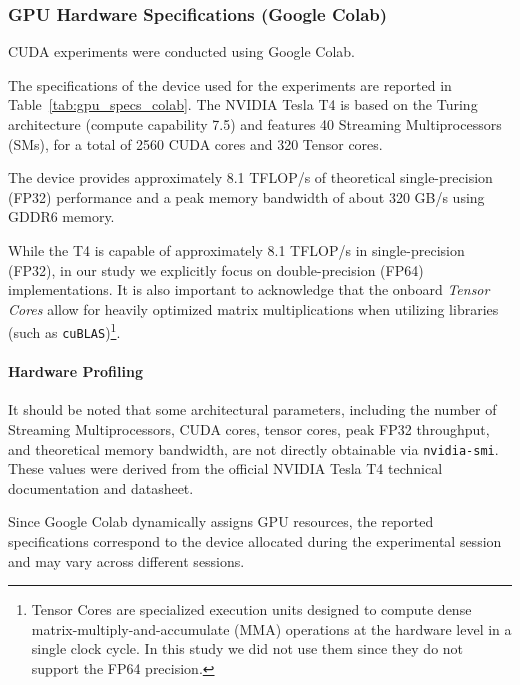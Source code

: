 \subsubsection{GPU Hardware Specifications (Google Colab)}\label{sec:GPU spec}
CUDA experiments were conducted using Google Colab. 


The specifications of the device used for the experiments are reported in Table~\ref{tab:gpu_specs_colab}. The NVIDIA Tesla T4 is based on the Turing architecture (compute capability 7.5) and features 40 Streaming Multiprocessors (SMs), for a total of 2560 CUDA cores and 320 Tensor cores. 

The device provides approximately 8.1 TFLOP/s of theoretical single-precision (FP32) performance and a peak memory bandwidth of about 320 GB/s using GDDR6 memory.

While the T4 is capable of approximately 8.1 TFLOP/s in single-precision (FP32), in our study we explicitly focus on double-precision (FP64) implementations.  
It is also important to acknowledge that the onboard \emph{Tensor Cores} allow for heavily optimized matrix multiplications when utilizing libraries (such as \texttt{cuBLAS})\footnote{Tensor Cores are specialized execution units designed to compute dense matrix-multiply-and-accumulate (MMA) operations at the hardware level in a single clock cycle. In this study we did not use them since they do not support the FP64 precision.}.


\paragraph{Hardware Profiling}
It should be noted that some architectural parameters, including the number of Streaming Multiprocessors, CUDA cores, tensor cores, peak FP32 throughput, and theoretical memory bandwidth, are not directly obtainable via \texttt{nvidia-smi}. 
These values were derived from the official NVIDIA Tesla T4 technical documentation and datasheet.

Since Google Colab dynamically assigns GPU resources, the reported specifications correspond to the device allocated during the experimental session and may vary across different sessions.






